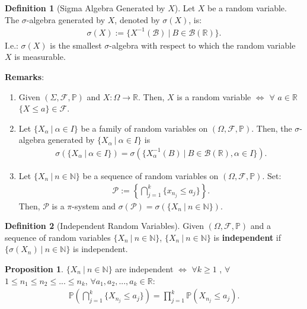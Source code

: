 \documentclass[11pt]{article}
\theoremstyle{definition}
\newtheorem{defn}{Definition}[section]
\newtheorem{prop}{Proposition}[section]
\theoremstyle{theorem}
\newcommand{\R}[0]{\mathbb{R}}
\newcommand{\N}[0]{\mathbb{N}}
\newcommand{\prob}[1]{\mathbb{P}\left(#1 \right)}
\begin{document}
\begin{defn}[Sigma Algebra Generated by \( X\)] 
	Let \( X \) be a random variable. The \( \sigma \)-algebra generated by \( X \), denoted by \( \sigma(X) \), is:
	\begin{align}
		\sigma(X) := \{ X^{-1}(\mathcal{B})\ |\ B \in \mathcal{B}(\R) \}.
	\end{align}
	I.e.: \( \sigma(X) \) is the smallest \( \sigma \)-algebra with respect to which the random variable \( X \) is measurable. 
\end{defn}
\textbf{Remarks}:
\begin{enumerate}[noitemsep]
	\item Given \( ( \Sigma, \mathcal{F}, \mathbb{P}) \) and \( X: \Omega \rightarrow \R \). Then, \( X \) is a random variable \( \iff \) \( \forall \) \( a \in \R \) \( \{ X \leq a \} \in \mathcal{F} \).
	\item Let \( \{ X_\alpha\ |\ \alpha \in I \} \) be a family of random variables on \( (\Omega, \mathcal{F}, \mathbb{P} ) \). Then, the \( \sigma \)-algebra generated by \( \{ X_\alpha\ |\ \alpha \in I \} \) is 
	\begin{align*}
		\sigma ( \{ X_\alpha\ |\ \alpha \in I \} ) = \sigma( \{ X_\alpha^{-1} (B)\ |\ B \in \mathcal{B}(\R), \alpha \in I \} ). 	
	\end{align*}
	\item Let \( \{ X_n\ |\ n \in \N \} \) be a sequence of random variables on \( ( \Omega, \mathcal{F}, \mathbb{P} ) \). Set:
	\begin{align*}
		\mathcal{P} := \left\{ \bigcap_{j=1}^k \{ x_{n_j} \leq a_j \}  \right \}.	
	\end{align*}
	Then, \( \mathcal{P} \) is a \( \pi \)-system and \( \sigma( \mathcal{P}) = \sigma (\{ X_n\ |\ n \in \N \} )\). 
\end{enumerate}

\begin{defn}[Independent Random Variables]
	Given \( (\Omega, \mathcal{F}, \mathbb{P} ) \) and a sequence of random variables \( \{ X_n\ |\ n \in \N \} \), \( \{ X_n\ |\ n \in \N \} \) is \textbf{independent} if \( \{ \sigma (X_n)\ |\ n \in \N \} \) is independent. 
\end{defn}

\begin{prop}
	\( \{ X_n\ |\ n \in \N \} \) are independent \( \iff \) \( \forall k \geq 1 \) , \( \forall \) \( 1 \leq n_1 \leq n_2 \leq ... \leq n_k \), \( \forall a_1, a_2, ...,a_k \in \R \):
	\begin{align}
		\prob{\bigcap_{j=1}^k \{ X_{n_j} \leq a_j \} } = \prod_{j=1}^k \prob{X_{n_j} \leq a_j }.
	\end{align}
\end{prop}
\end{document}
